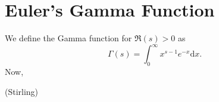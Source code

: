 \section{Euler's Gamma Function}
We define the Gamma function for $\mathfrak{R}(s) > 0$ as 
\begin{equation}
\label{GammaDefinition}
    \Gamma(s) = \int_{0}^{\infty}x^{s - 1}e^{-x} \mathrm{d}x.
\end{equation}
 Now, 


\begin{theorem}
(Stirling)
\end{theorem}